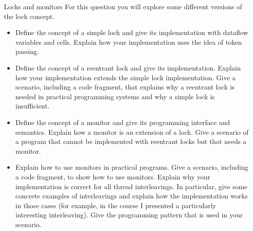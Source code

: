 \begin{Q3}{Locks and monitors}
  For this question you will explore some different versions of the lock concept.
  \begin{itemize}
    \item Define the concept of a simple lock and give its implementation with dataflow variables and cells.
      Explain how your implementation uses the idea of token passing.
    \item Define the concept of a reentrant lock and give its implementation.
      Explain how your implementation extends the simple lock implementation.
      Give a scenario, including a code fragment, that explains why a reentrant lock is needed in practical programming systems and
      why a simple lock is insufficient.
    \item Define the concept of a monitor and give its programming interface and semantics.
      Explain how a monitor is an extension of a lock.
      Give a scenario of a program that cannot be implemented with reentrant locks but that needs a monitor.
    \item Explain how to use monitors in practical programs.
      Give a scenario, including a code fragment, to show how to use monitors.
      Explain why your implementation is correct for all thread interleavings.
      In particular, give some concrete examples of interleavings and explain how the implementation works in those cases
      (for example, in the course I presented a particularly interesting interleaving).
      Give the programming pattern that is used in your scenario.
  \end{itemize}
\end{Q3}


